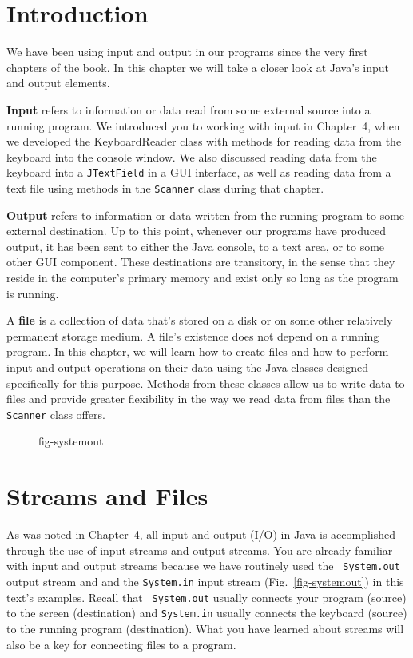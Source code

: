 \section{Introduction}
\noindent We have been using input and output in our programs 
since the very first chapters of the book. In this chapter we
will take a closer look at Java's input and output elements.

{\bf Input} refers to information or data read from some external
source into a running program. We introduced you to working with input
in Chapter~4, when we developed the KeyboardReader class with methods
for reading data from the keyboard into the console window. We also
discussed reading data from the keyboard into a {\tt JTextField} in a
GUI interface, as well as  reading data
from a text file using methods in the {\tt Scanner} class during that
chapter.

{\bf Output} refers to information or data written from the running
program to some external destination.  Up to this point, whenever our
programs have produced output, it has been sent to either the Java
console, to a text area, or to some other GUI component.  These
destinations are transitory, in the sense that they reside in the
computer's primary memory and exist only so long as the program is
running.

A {\bf file} is a collection of data that's stored on a disk or on
some other relatively permanent storage medium.  A file's existence
does not depend on a running program.  In this chapter, we will learn
how to create files and how to perform input and output operations on
their data using the Java classes designed specifically for this
purpose.  Methods from these classes allow us to write data to files
and provide greater flexibility in the way we read data from files 
than the {\tt Scanner} class offers.

\begin{figure}[b]
 {fig-systemout}

\end{figure}

\section{Streams and Files}
\noindent As was noted in Chapter~4, all input and output (I/O) in
Java is accomplished through the use of input streams and output
streams.  You are already familiar with input and output streams
because we  have routinely used the {\tt
System.out} output stream and and the {\tt System.in} input stream
(Fig.~\ref{fig-systemout}) in this text's examples. Recall that {\tt
System.out} usually connects your program (source) to the screen
(destination) and {\tt System.in} usually connects the keyboard
(source) to the running program (destination). What you have learned
about streams will also be a key for connecting files to a program.

